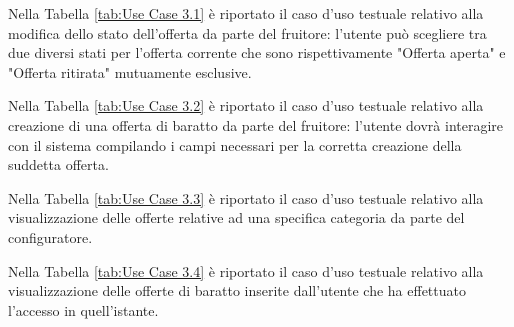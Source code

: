 

Nella Tabella \ref{tab:Use Case 3.1} è riportato il caso d'uso testuale relativo alla modifica dello stato dell'offerta da parte del fruitore: l'utente può scegliere tra due diversi stati per l'offerta corrente che sono rispettivamente "Offerta aperta" e "Offerta ritirata" mutuamente esclusive.\bigskip

Nella Tabella \ref{tab:Use Case 3.2} è riportato il caso d'uso testuale relativo alla creazione di una offerta di baratto da parte del fruitore: l'utente dovrà interagire con il sistema compilando i campi necessari per la corretta creazione della suddetta offerta.\bigskip

Nella Tabella \ref{tab:Use Case 3.3} è riportato il caso d'uso testuale relativo alla visualizzazione delle offerte relative ad una specifica categoria da parte del configuratore.\bigskip

Nella Tabella \ref{tab:Use Case 3.4} è riportato il caso d'uso testuale relativo alla visualizzazione delle offerte di baratto inserite dall'utente che ha effettuato l'accesso in quell'istante.\bigskip